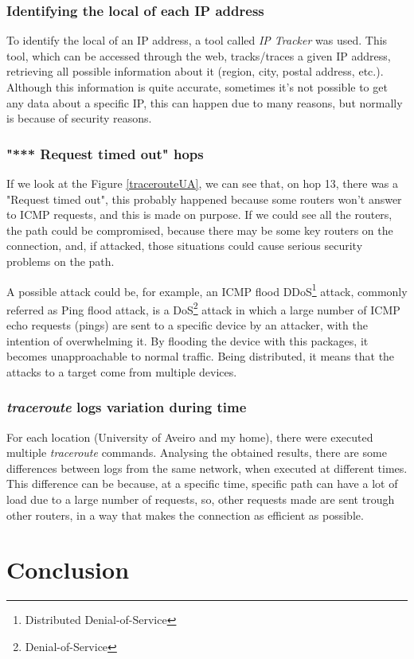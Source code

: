 \documentclass{article}
\newcommand\tab[1][1cm]{\hspace*{#1}}
\begin{document}
\subsubsection{Identifying the local of each IP address}

\tab To identify the local of an IP address, a tool called \textit{IP Tracker} was used. This tool, which can be accessed through the web, tracks/traces a given IP address, retrieving all possible information about it (region, city, postal address, etc.). Although this information is quite accurate, sometimes it's not possible to get any data about a specific IP, this can happen due to many reasons, but normally is because of security reasons.

\subsubsection{"*** Request timed out" hops}

\tab If we look at the Figure \underline{\ref{tracerouteUA}}, we can see that, on hop 13, there was a "Request timed out", this probably happened because some routers won't answer to ICMP requests, and this is made on purpose. If we could see all the routers, the path could be compromised, because there may be some key routers on the connection, and, if attacked, those situations could cause serious security problems on the path.

A possible attack could be, for example, an ICMP flood DDoS\footnote{Distributed Denial-of-Service} attack, commonly referred as Ping flood attack, is a DoS\footnote{Denial-of-Service} attack in which a large number of ICMP echo requests (pings) are sent to a specific device by an attacker, with the intention of overwhelming it. By flooding the device with this packages, it becomes unapproachable to normal traffic. Being distributed, it means that the attacks to a target come from multiple devices.

\subsubsection{\textit{traceroute} logs variation during time}

\tab For each location (University of Aveiro and my home), there were executed multiple \textit{traceroute} commands. Analysing the obtained results, there are some differences between logs from the same network, when executed at different times. This difference can be because, at a specific time, specific path can have a lot of load due to a large number of requests, so, other requests made are sent trough other routers, in a way that makes the connection as efficient as possible.



\section{Conclusion}

\nocite{*}
\printbibliography
\end{document}
